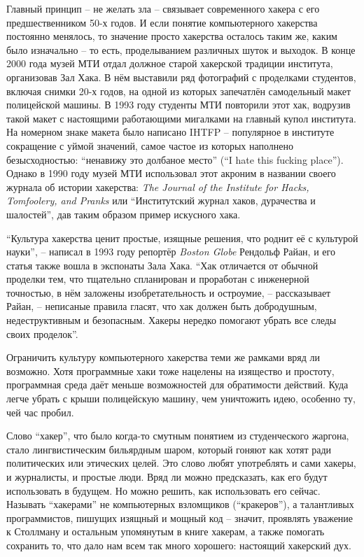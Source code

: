 Главный принцип -- не желать зла -- связывает современного хакера с его предшественником 50-х годов. И если понятие компьютерного хакерства постоянно менялось, то значение просто хакерства осталось таким же, каким было изначально -- то есть, проделыванием различных шуток и выходок. В конце 2000 года музей МТИ отдал должное старой хакерской традиции института, организовав Зал Хака. В нём выставили ряд фотографий с проделками студентов, включая снимки 20-х годов, на одной из которых запечатлён самодельный макет полицейской машины. В 1993 году студенты МТИ повторили этот хак, водрузив такой макет с настоящими работающими мигалками на главный купол института. На номерном знаке макета было написано IHTFP -- популярное в институте сокращение с уймой значений, самое частое из которых наполнено безысходностью: ``ненавижу это долбаное место'' (``I hate this fucking place''). Однако в 1990 году музей МТИ использовал этот акроним в названии своего журнала об истории хакерства: \textit{The Journal of the Institute for Hacks, Tomfoolery, and Pranks} или ``Институтский журнал хаков, дурачества и шалостей'', дав таким образом пример искусного хака.

``Культура хакерства ценит простые, изящные решения, что роднит её с культурой науки'', -- написал в 1993 году репортёр \textit{Boston Globe} Рендольф Райан, и его статья также вошла в экспонаты Зала Хака. ``Хак отличается от обычной проделки тем, что тщательно спланирован и проработан с инженерной точностью, в нём заложены изобретательность и остроумие, -- рассказывает Райан, -- неписаные правила гласят, что хак должен быть добродушным, недеструктивным и безопасным. Хакеры нередко помогают убрать все следы своих проделок''.

Ограничить культуру компьютерного хакерства теми же рамками вряд ли возможно. Хотя программные хаки тоже нацелены на изящество и простоту, программная среда даёт меньше возможностей для обратимости действий. Куда легче убрать с крыши полицейскую машину, чем уничтожить идею, особенно ту, чей час пробил.

Слово ``хакер'', что было когда-то смутным понятием из студенческого жаргона, стало лингвистическим бильярдным шаром, который гоняют как хотят ради политических или этических целей. Это слово любят употреблять и сами хакеры, и журналисты, и простые люди. Вряд ли можно предсказать, как его будут использовать в будущем. Но можно решить, как использовать его сейчас. Называть ``хакерами'' не компьютерных взломщиков (``кракеров''), а талантливых программистов, пишущих изящный и мощный код -- значит, проявлять уважение к Столлману и остальным упомянутым в книге хакерам, а также помогать сохранить то, что дало нам всем так много хорошего: настоящий хакерский дух.
